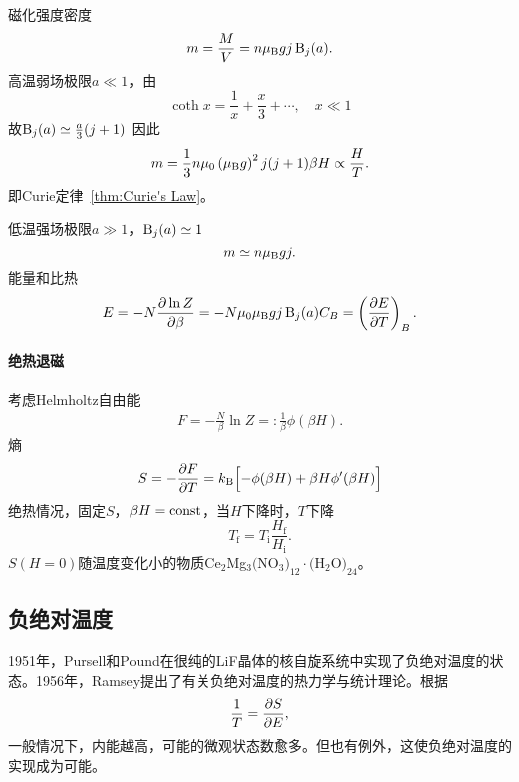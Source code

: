 磁化强度密度
\begin{align}
	m=\frac MV=n\muB gj\Brill_j(a). %
\end{align}
高温弱场极限$a\ll 1$，由
\[
	\coth x=\frac1x+\frac x3+\cdots,\quad x\ll 1
\]
故$\operatorname{B}_j(a)\simeq\frac a3(j+1)$
因此
\[
	m=\frac13n\mu_0\left(\mu_\mathrm B g\right)^2j(j+1)\beta H\propto\frac HT.
\]
即Curie定律~\ref{thm:Curie's Law}。

低温强场极限$a\gg 1$，$\operatorname{B}_j(a)\simeq 1$
\[
	m\simeq n\mu_\mathrm B gj.
\]
能量和比热
\begin{gather}
	E=-N\pv{\ln Z}\beta=-N\mu_0\muB gj\Brill_j(a)
	C_B=\kh{\pv ET}_B.
\end{gather}

\paragraph*{绝热退磁}考虑Helmholtz自由能
\begin{align}
	F=-\frac N\beta\ln Z=:\frac1\beta\phi(\beta H).
\end{align}
熵
\begin{align}
	S=-\frac{\partial^{\;\!\!}F}{\partial T^{\;\!\!}}=k_{\mathrm B}\Bigl[-\phi(\beta H)+\beta H\phi'(\beta H)\Bigr]
\end{align}
绝热情况，固定$S$，$\beta H=\mathrm{const}$，当$H$下降时，$T$下降
\[
	T_\mathrm f=T_\mathrm i\frac{H_\mathrm f}{H_\mathrm i}.
\]
$S(H=0)$随温度变化小的物质Ce$_2$Mg$_3($NO$_3)_{12}\cdot($H$_2$O$)_{24}$。
\subsection{负绝对温度}
1951年，Pursell和Pound在很纯的LiF晶体的核自旋系统中实现了负绝对温度的状态。1956年，Ramsey提出了有关负绝对温度的热力学与统计理论。根据
\[
	\frac1T=\frac{\partial^{\;\!\!}S}{\partial E^{\;\!\!}},
\]
一般情况下，内能越高，可能的微观状态数愈多。但也有例外，这使负绝对温度的实现成为可能。
